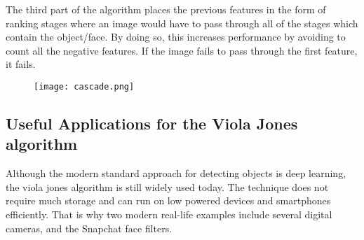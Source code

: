                 The third part of the algorithm places the previous
                features in the form of ranking stages where an image
                would have to pass through all of the stages which
                contain the object/face. By doing so, this increases
                performance by avoiding to count all the negative
                features. If the image fails to pass through the first
                feature, it fails.


            \begin{figure}[ht]
            \texttt{[image: cascade.png]}
            \centering
            \end{figure}

            \subsection{Useful Applications for the Viola Jones algorithm}
            Although the modern standard approach for detecting
            objects is deep learning, the viola jones algorithm is
            still widely used today. The technique does not require
            much storage and can run on low powered devices and
            smartphones efficiently. That is why two modern real-life
            examples include several digital cameras, and the Snapchat
            face filters. \cite{Bansal}
